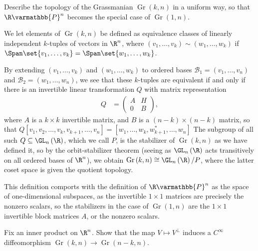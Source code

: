 \documentclass[10pt]{mypackage}
\renewcommand*{\mathbb}[1]{\varmathbb{#1}}
\begin{document}
\RaggedRight
\begin{problem}[Problem 1]
  Describe the topology of the Grassmanian $\operatorname{Gr}\left( k,n \right)$ in a uniform way, so that $\R\mathbb{P}^n$ becomes the special case of $\operatorname{Gr}\left( 1,n \right)$.
\end{problem}
\begin{solution}
We let elements of $\operatorname{Gr}\left( k,n \right)$ be defined as equivalence classes of linearly independent $k$-tuples of vectors in $\R^n$, where $\left( v_1,\dots,v_k \right) \sim \left( w_1,\dots,w_k \right)$ if $\Span \set{v_1,\dots,v_k} = \Span\set{w_1,\dots,w_k} $.\newline

By extending $\left( v_1,\dots,v_k \right)$ and $\left( w_1,\dots,w_k \right)$ to ordered bases $\mathcal{B}_1 = \left( v_1,\dots,v_n \right)$ and $\mathcal{B}_2 = \left( w_1,\dots,w_n \right)$, we see that these $k$-tuples are equivalent if and only if there is an invertible linear transformation $Q$ with matrix representation
\begin{align*}
  Q &= \begin{pmatrix}A & H \\ 0 & B\end{pmatrix},
\end{align*}
where $A$ is a $k\times k$ invertible matrix, and $B$ is a $\left( n-k \right)\times \left( n-k \right)$ matrix, so that $ Q \left[ v_1,v_2,\dots,v_k,v_{k+1},\dots,v_n \right] = \left[ w_1,\dots,w_k,w^{\ast}_{k+1},\dots,w_n \right] $ The subgroup of all such $Q\subseteq \GL_n\left( \R \right)$, which we call $P$, is the stabilizer of $\operatorname{Gr}\left( k,n \right)$ as we have defined it, so by the orbit-stabilizer theorem (seeing as $\GL_n\left( \R \right)$ acts transitively on all ordered bases of $\R^n$), we obtain $\operatorname{Gr}\left( k,n \right)\cong \GL_n\left( \R \right)/P$, where the latter coset space is given the quotient topology.\newline

This definition comports with the definition of $\R\mathbb{P}^{n}$ as the space of one-dimensional subspaces, as the invertible $1\times 1$ matrices are precisely the nonzero scalars, so the stabilizers in the case of $\operatorname{Gr}\left( 1,n \right)$ are the $1\times 1$ invertible block matrices $A$, or the nonzero scalars.
\end{solution}
\begin{problem}[Problem 2]
  Fix an inner product on $\R^n$. Show that the map $V\mapsto V^{\perp}$ induces a $C^{\infty}$ diffeomorphism $\operatorname{Gr}\left( k,n \right)\rightarrow \operatorname{Gr}\left( n-k,n \right)$.
\end{problem}
\end{document}
